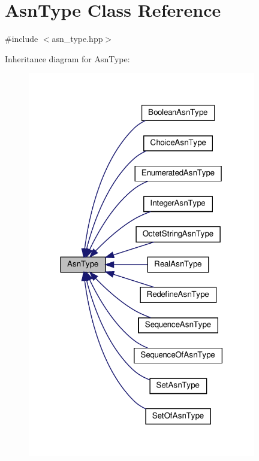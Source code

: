 \hypertarget{classAsnType}{}\section{Asn\+Type Class Reference}
\label{classAsnType}


{\ttfamily \#include $<$asn\+\_\+type.\+hpp$>$}



Inheritance diagram for Asn\+Type\+:
\nopagebreak
\begin{figure}[H]
\begin{center}
\leavevmode
\includegraphics[width=282pt]{db/dee/classAsnType__inherit__graph}
\end{center}
\end{figure}
